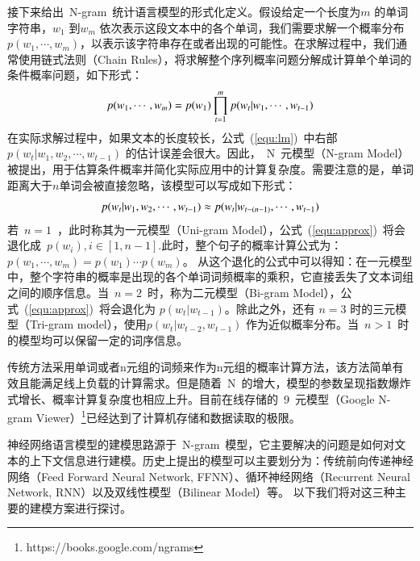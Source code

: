 接下来给出~N-gram~统计语言模型的形式化定义。假设给定一个长度为$m$ 的单词字符串，$w_1$ 到$w_m$ 依次表示这段文本中的各个单词，我们需要求解一个概率分布$p(w_1,\cdots,w_m)$，以表示该字符串存在或者出现的可能性。在求解过程中，我们通常使用链式法则（Chain Rules），将求解整个序列概率问题分解成计算单个单词的条件概率问题，如下形式：
\begin{equation}
\setlength{\abovedisplayskip}{6pt}
\setlength{\belowdisplayskip}{6pt}
\label{equ:lm}
p(w_1,\cdots,w_m) =p(w_1)\prod_{t=1}^{m}p(w_t|w_1,\cdots,w_{t-1})
\end{equation}
在实际求解过程中，如果文本的长度较长，公式~(\ref{equ:lm})~中右部~$p(w_t | w_1,w_2,\cdots,w_{t-1}) $ 的估计误差会很大。因此，~N~元模型（N-gram Model）被提出，用于估算条件概率并简化实际应用中的计算复杂度。需要注意的是，单词距离大于$n$单词会被直接忽略，该模型可以写成如下形式：
\begin{equation}
\setlength{\abovedisplayskip}{6pt}
\setlength{\belowdisplayskip}{6pt}
\label{equ:approx}
p(w_t | w_1,w_2,\cdots,w_{t-1})  \approx p(w_t | w_{t-(n-1)},\cdots,w_{t-1})
\end{equation}
若~$n=1$~，此时称其为一元模型（Uni-gram Model），公式~(\ref{equ:approx})~将会退化成~$p(w_i),i\in [1,n-1]$.此时，整个句子的概率计算公式为：~$p(w_1,\cdots,w_m) = p(w_1)\cdots p(w_m)$。
从这个退化的公式中可以得知：在一元模型中，整个字符串的概率是出现的各个单词词频概率的乘积，它直接丢失了文本词组之间的顺序信息。当~$n = 2$~时，称为二元模型（Bi-gram Model），公式~(\ref{equ:approx})~将会退化为 $p(w_t|w_{t-1})$。除此之外，还有 $n=3$ 时的三元模型（Tri-gram model），使用$p(w_t |w_{t-2},w_{t-1})$ 作为近似概率分布。当~$n>1$~时的模型均可以保留一定的词序信息。

传统方法采用单词或者n元组的词频来作为n元组的概率计算方法，该方法简单有效且能满足线上负载的计算需求。但是随着~N~的增大，模型的参数呈现指数爆炸式增长、概率计算复杂度也相应上升。目前在线存储的~9~元模型（Google N-gram Viewer）\footnote{https://books.google.com/ngrams}已经达到了计算机存储和数据读取的极限。


神经网络语言模型的建模思路源于~N-gram~模型，它主要解决的问题是如何对文本的上下文信息进行建模。历史上提出的模型可以主要划分为：传统前向传递神经网络（Feed Forward Neural Network, FFNN）、循环神经网络（Recurrent Neural Network, RNN）以及双线性模型（Bilinear Model）等。 以下我们将对这三种主要的建模方案进行探讨。



